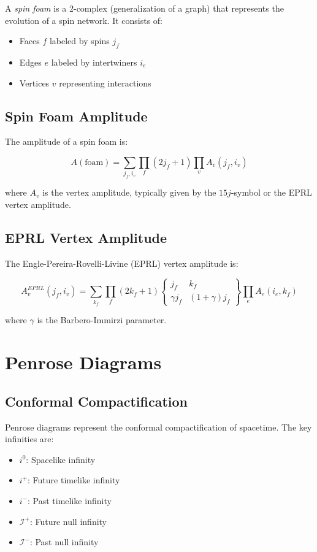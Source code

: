 \documentclass[12pt,a4paper]{article}
\begin{document}
A \textit{spin foam} is a 2-complex (generalization of a graph) that represents the evolution of a spin network. It consists of:
\begin{itemize}
    \item Faces $f$ labeled by spins $j_f$
    \item Edges $e$ labeled by intertwiners $i_e$
    \item Vertices $v$ representing interactions
\end{itemize}

\subsection{Spin Foam Amplitude}

The amplitude of a spin foam is:

\begin{equation}
A(\text{foam}) = \sum_{j_f, i_v} \prod_f (2j_f + 1) \prod_v A_v(j_f, i_v)
\end{equation}

where $A_v$ is the vertex amplitude, typically given by the $15j$-symbol or the EPRL vertex amplitude.

\subsection{EPRL Vertex Amplitude}

The Engle-Pereira-Rovelli-Livine (EPRL) vertex amplitude is:

\begin{equation}
A_v^{EPRL}(j_f, i_v) = \sum_{k_f} \prod_f (2k_f + 1) \begin{Bmatrix} j_f & k_f \\ \gamma j_f & (1+\gamma)j_f \end{Bmatrix} \prod_e A_e(i_e, k_f)
\end{equation}

where $\gamma$ is the Barbero-Immirzi parameter.

\section{Penrose Diagrams}

\subsection{Conformal Compactification}

Penrose diagrams represent the conformal compactification of spacetime. The key infinities are:
\begin{itemize}
    \item $i^0$: Spacelike infinity
    \item $i^+$: Future timelike infinity
    \item $i^-$: Past timelike infinity
    \item $\mathscr{I}^+$: Future null infinity
    \item $\mathscr{I}^-$: Past null infinity
\end{itemize}
\end{document}

